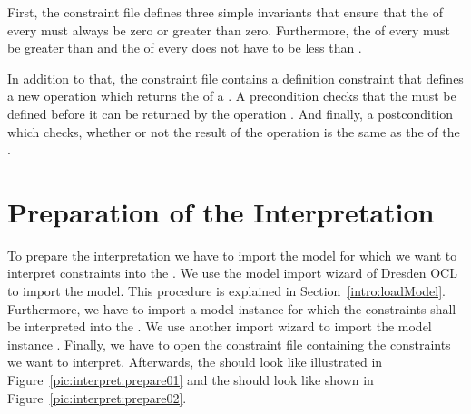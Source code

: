 First, the constraint file defines three simple invariants that ensure that the
 of every  must always be zero or greater than zero.
Furthermore, the  of every  must be greater than
 and the  of every  does not have to be
less than .

In addition to that, the constraint file contains a definition constraint that 
defines a new operation  which returns the  of a 
. A precondition checks that the  must be defined 
before it can be returned by the operation . And finally, a 
postcondition which checks, whether or not the result of the operation 
 is the same as the  of the .



\section{Preparation of the Interpretation}

To prepare the interpretation we have to import the model 
 for which we want to interpret constraints into the
. We use the model import wizard of Dresden OCL to
import the model. This procedure is explained in Section~\ref{intro:loadModel}.
Furthermore, we have to import a model instance for which the constraints shall 
be interpreted into the . We use another import 
wizard to import the model instance 
.
Finally, we have to open the constraint file 
containing the constraints we want to interpret. Afterwards, the  should look like illustrated in Figure~\ref{pic:interpret:prepare01} 
and the  should look like shown in 
Figure~\ref{pic:interpret:prepare02}.

